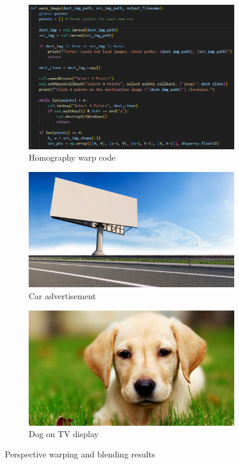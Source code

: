 \documentclass[11pt,a4paper]{article}
\begin{document}
\begin{figure}[H]\centering
\begin{subfigure}{0.31\textwidth}
\includegraphics[width=\linewidth]{images/q3_code.png}
\caption{Homography warp code}
\end{subfigure}
\begin{subfigure}{0.31\textwidth}
\includegraphics[width=\linewidth]{images/bill_board.png}
\caption{Car advertisement}
\end{subfigure}
\begin{subfigure}{0.31\textwidth}
\includegraphics[width=\linewidth]{images/dog.png}
\caption{Dog on TV display}
\end{subfigure}
\caption{Perspective warping and blending results}
\end{figure}
\end{document}

